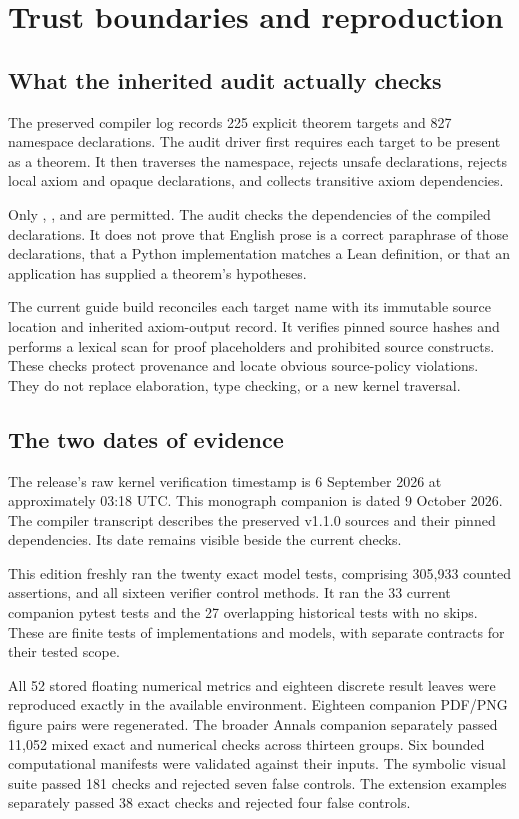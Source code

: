 \section{Trust boundaries and reproduction}
\label{sec:reproduce}
\subsection{What the inherited audit actually checks}
The preserved compiler log records 225 explicit theorem targets and 827 namespace declarations. The audit driver first requires each target to be present as a theorem. It then traverses the  namespace, rejects unsafe declarations, rejects local axiom and opaque declarations, and collects transitive axiom dependencies.

Only , , and  are permitted. The audit checks the dependencies of the compiled declarations. It does not prove that English prose is a correct paraphrase of those declarations, that a Python implementation matches a Lean definition, or that an application has supplied a theorem's hypotheses.

The current guide build reconciles each target name with its immutable source location and inherited axiom-output record. It verifies pinned source hashes and performs a lexical scan for proof placeholders and prohibited source constructs. These checks protect provenance and locate obvious source-policy violations. They do not replace elaboration, type checking, or a new kernel traversal.

\subsection{The two dates of evidence}
The release's raw kernel verification timestamp is 6 September 2026 at approximately 03:18 UTC. This monograph companion is dated 9 October 2026. The compiler transcript describes the preserved v1.1.0 sources and their pinned dependencies. Its date remains visible beside the current checks.

This edition freshly ran the twenty exact model tests, comprising 305,933 counted assertions, and all sixteen verifier control methods. It ran the 33 current companion pytest tests and the 27 overlapping historical tests with no skips. These are finite tests of implementations and models, with separate contracts for their tested scope.

All 52 stored floating numerical metrics and eighteen discrete result leaves were reproduced exactly in the available environment. Eighteen companion PDF/PNG figure pairs were regenerated. The broader Annals companion separately passed 11,052 mixed exact and numerical checks across thirteen groups. Six bounded computational manifests were validated against their inputs. The symbolic visual suite passed 181 checks and rejected seven false controls. The extension examples separately passed 38 exact checks and rejected four false controls.


